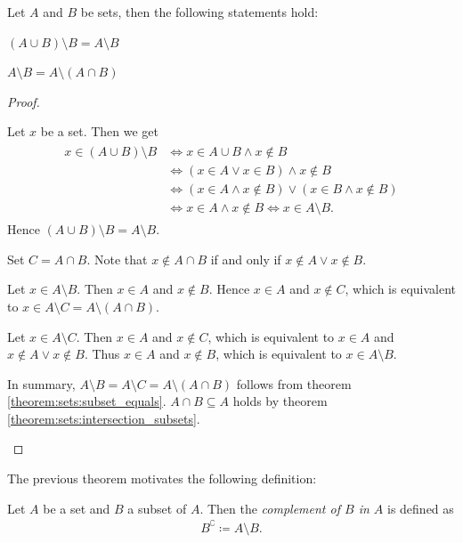 \begin{theorem}
    Let $A$ and $B$ be sets, then the following statements hold:
    \begin{intheoremenumerate}
        \item\label{theorem:sets:difference_supset} $(A\cup B)\setminus B=A\setminus B$
        \item\label{theorem:sets:difference_subsets_only} $A\setminus B=A\setminus(A\cap B)$
    \end{intheoremenumerate}
\end{theorem}
\begin{proof}
    \begin{proofenumerate}
        \item Let $x$ be a set. Then we get \begin{align}\begin{split}x\in (A\cup B)\setminus B&\Leftrightarrow x\in A\cup B\land x\notin B\\&\Leftrightarrow (x\in A\lor x\in B)\land x\notin B\\&\Leftrightarrow (x\in A\land x\notin B)\lor (x\in B\land x\notin B)\\&\Leftrightarrow x\in A\land x\notin B\Leftrightarrow x\in A\setminus B.\end{split}\end{align}
        Hence $(A\cup B)\setminus B=A\setminus B$.
        \item Set $C=A\cap B$. Note that $x\notin A\cap B$ if and only if $x\notin A\lor x\notin B$.

        \proofsubset Let $x\in A\setminus B$. Then $x\in A$ and $x\notin B$. Hence $x\in A$ and $x\notin C$, which is equivalent to $x\in A\setminus C=A\setminus(A\cap B)$.

        \proofsupset Let $x\in A\setminus C$. Then $x\in A$ and $x\notin C$, which is equivalent to $x\in A$ and $x\notin A\lor x\notin B$. Thus $x\in A$ and $x\notin B$, which is equivalent to $x\in A\setminus B$.
        
        In summary, $A\setminus B=A\setminus C=A\setminus(A\cap B)$ follows from theorem \ref{theorem:sets:subset_equals}. $A\cap B\subseteq A$ holds by theorem \ref{theorem:sets:intersection_subsets}.
    \end{proofenumerate}
\end{proof}

The previous theorem motivates the following definition:

\begin{definition}
    Let $A$ be a set and $B$ a subset of $A$. Then the \emph{complement of $B$ in $A$} is defined as \begin{align}B^\complement\coloneq A\setminus B.\end{align}
\end{definition}

